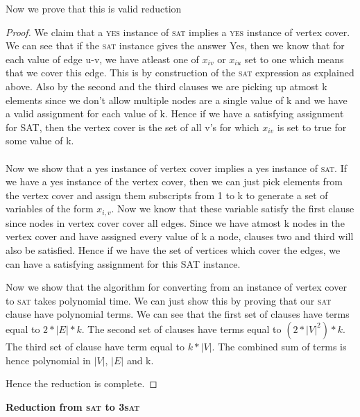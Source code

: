 \documentclass[11pt]{article}
\begin{document}
Now we prove that this is valid reduction
\begin{proof}
We claim that a \textsc{yes} instance of \textsc{sat} implies a \textsc{yes} instance of vertex cover. We can see that if the \textsc{sat} instance gives the answer Yes, then we know that for each value of edge u-v, we have atleast one of $x_{iv}$ or $x_{iu}$ set to one which means that we cover this edge. This is by construction of the \textsc{sat} expression as explained above. Also by the second and the third clauses we are picking up atmost k elements since we don't allow multiple nodes are a single value of k and we have a valid assignment for each value of k. Hence if we have a satisfying assignment for SAT, then the vertex cover is the set of all v's for which $x_{iv}$ is set to true for some value of  k. \\\\
Now we show that a yes instance of vertex cover implies a yes instance of \textsc{sat}. If we have a yes instance of the vertex cover, then we can just pick elements from the vertex cover and assign them subscripts from 1 to k to generate a set of variables of the form $x_{i,v}$. Now we know that these variable satisfy the first clause since nodes in vertex cover cover all edges. Since we have atmost k nodes in the vertex cover and have assigned every value of k a node, clauses two and third will also be satisfied. Hence if we have the set of vertices which cover the edges, we can have a satisfying assignment for this SAT instance.

Now we show that the algorithm for converting from an instance of vertex cover to \textsc{sat} takes polynomial time. We can just show this by proving that our \textsc{sat} clause have polynomial terms. We can see that the first set of clauses have terms equal to $2* |E| * k$. The second set of clauses have terms equal to $(2*|V|^2) * k$. The third set of clause have term equal to $k * |V|$. The combined sum of terms is hence polynomial in $|V|$, $|E|$ and k.

Hence the reduction is complete.
\end{proof}

\textbf{Reduction from \textsc{sat} to \textsc{3sat}}
\end{document}

